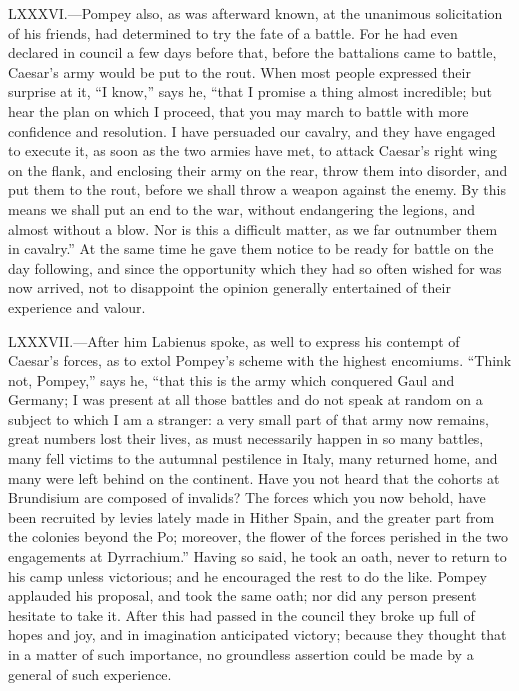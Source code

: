 LXXXVI.—Pompey also, as was afterward known, at the unanimous
solicitation of his friends, had determined to try the fate of a battle.
For he had even declared in council a few days before that, before the
battalions came to battle, Caesar's army would be put to the rout. When
most people expressed their surprise at it, ``I know,'' says he, ``that I
promise a thing almost incredible; but hear the plan on which I proceed,
that you may march to battle with more confidence and resolution. I have
persuaded our cavalry, and they have engaged to execute it, as soon as
the two armies have met, to attack Caesar's right wing on the flank, and
enclosing their army on the rear, throw them into disorder, and put them
to the rout, before we shall throw a weapon against the enemy. By this
means we shall put an end to the war, without endangering the legions,
and almost without a blow. Nor is this a difficult matter, as we far
outnumber them in cavalry.'' At the same time he gave them notice to be
ready for battle on the day following, and since the opportunity which
they had so often wished for was now arrived, not to disappoint the
opinion generally entertained of their experience and valour.

LXXXVII.—After him Labienus spoke, as well to express his contempt of
Caesar's forces, as to extol Pompey's scheme with the highest encomiums.
``Think not, Pompey,'' says he, ``that this is the army which conquered
Gaul and Germany; I was present at all those battles and do not speak at
random on a subject to which I am a stranger: a very small part of that
army now remains, great numbers lost their lives, as must necessarily
happen in so many battles, many fell victims to the autumnal pestilence
in Italy, many returned home, and many were left behind on the
continent. Have you not heard that the cohorts at Brundisium are
composed of invalids? The forces which you now behold, have been
recruited by levies lately made in Hither Spain, and the greater part
from the colonies beyond the Po; moreover, the flower of the forces
perished in the two engagements at Dyrrachium.'' Having so said, he took
an oath, never to return to his camp unless victorious; and he
encouraged the rest to do the like. Pompey applauded his proposal, and
took the same oath; nor did any person present hesitate to take it.
After this had passed in the council they broke up full of hopes and
joy, and in imagination anticipated victory; because they thought that
in a matter of such importance, no groundless assertion could be made by
a general of such experience.

